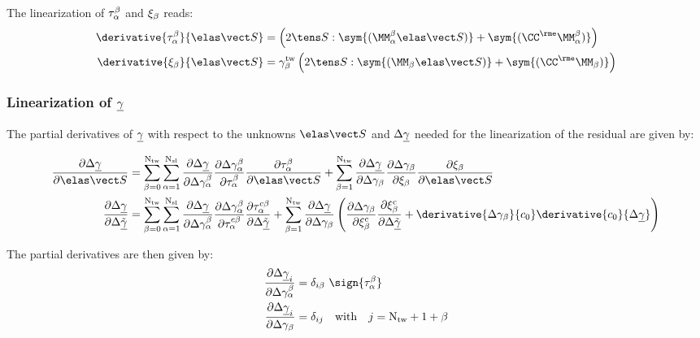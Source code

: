   The linearization of $\tau_{\alpha}^{\beta}$ and $\xi_\beta$ reads:
  \begin{align}
    \derivative{\tauab}{\SSe} &= \left(2 \SSSS:\sym{(\MMab \SSe)} + \sym{(\CCe \MMab)}\right) \\
    \derivative{\xib}{\SSe} &= \angleTwb \left(2 \SSSS:\sym{(\MMb \SSe)}  + \sym{(\CCe \MMb)}\right) \\
  \end{align}
  
  \subsubsection*{Linearization of $\underline{\gamma}$}
  
  The partial derivatives of $\underline{\gamma}$ with respect to the unknowns $\SSe$ and $\Delta\underline{\gamma}$ needed for the linearization of the residual are given by:
  
  \begin{align}
    \dDeltagammauDSSe &= \sumbONtw \sumaNsl \dDeltagammauDDeltagammaab \dDeltagammaabDtauab \dtauabDSSe + \sumbNtw \dDeltagammauDDeltagammab \dDeltagammabDxib \dxibDSSe \\
    \dDeltagammauDDeltagammau &= \sumbONtw \sumaNsl \dDeltagammauDDeltagammaab \dDeltagammaabDtauacb \dtauacbDDeltagammau + \sumbNtw \dDeltagammauDDeltagammab \left( \dDeltagammabDxibc \dxibcDDeltagammau + \derivative{\Delta\gammab}{c_0}\derivative{c_0}{\Delta\gammau} \right)
  \end{align}
  

  The partial derivatives are then given by:
  \begin{align}
    \frac{\partial \Delta\gammau_i}{\partial \Delta\gammaab} &= \delta_{i\beta} \ \sign{\tauab} \\
    \frac{\partial \Delta\gammau_i}{\partial \Delta\gammab} &= \delta_{ij} \quad \text{with} \quad j=\Ntw+1+\beta
  \end{align}
  
